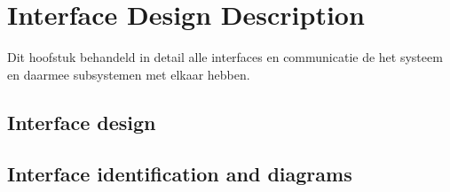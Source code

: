 \section{Interface Design Description}
Dit hoofstuk behandeld in detail alle interfaces en communicatie de het systeem
en daarmee subsystemen met elkaar hebben.

\subsection{Interface design}

\subsection{Interface identification and diagrams}